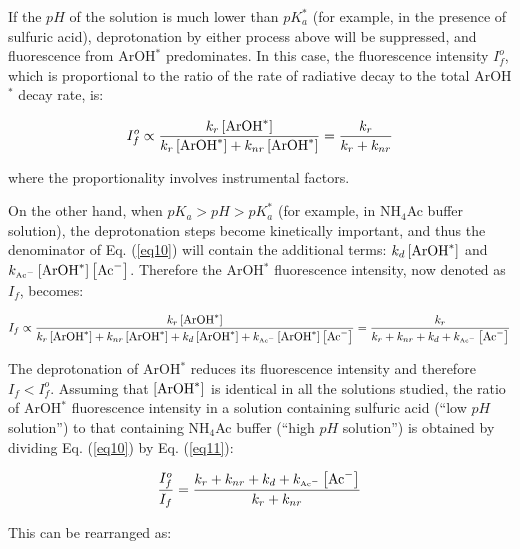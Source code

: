 \documentclass[byrevtex,amssymb,aps,pra,floatfix,letterpaper]{revtex4}
\begin{document}
If the $pH$ of the solution is much lower than $pK_a^*$ (for example, in the presence of sulfuric acid), deprotonation by either process above will be suppressed, and fluorescence from ArOH$^*$ predominates. In this case, the fluorescence intensity $I_f^o$, which is proportional to the ratio of the rate of radiative decay to the total ArOH$^*$ decay rate, is:

\begin{equation}
I_f^o \propto \frac{k_r\left[\textnormal{ArOH}^*\right]}{k_r\left[\textnormal{ArOH}^*\right] + k_{nr}\left[\textnormal{ArOH}^*\right]} = \frac{k_r}{k_r + k_{nr}}
\label{eq10}
\end{equation}

\noindent
where the proportionality involves instrumental factors.

On the other hand, when $pK_a > pH > pK_a^*$ (for example, in NH$_4$Ac buffer solution), the deprotonation steps become kinetically important, and thus the denominator of Eq. (\ref{eq10}) will contain the additional terms: $k_d\left[\textnormal{ArOH}^*\right]$ and $k_{\textnormal{\tiny Ac}^-}\left[\textnormal{ArOH}^*\right]\left[\textnormal{Ac}^-\right]$. Therefore the ArOH$^*$ fluorescence intensity, now denoted as $I_f$, becomes:

\begin{equation}
I_f \propto \frac{k_r\left[\textnormal{ArOH}^*\right]}{k_r\left[\textnormal{ArOH}^*\right] + k_{nr}\left[\textnormal{ArOH}^*\right] + k_d\left[\textnormal{ArOH}^*\right] + k_{\textnormal{\tiny Ac}^-}\left[\textnormal{ArOH}^*\right]\left[\textnormal{Ac}^-\right]} = \frac{k_r}{k_r + k_{nr} + k_d + k_{\textnormal{\tiny Ac}^-}\left[\textnormal{Ac}^-\right]}
\label{eq11}
\end{equation}

\noindent
The deprotonation of ArOH$^*$ reduces its fluorescence intensity and therefore $I_f < I_f^o$. Assuming that $\left[\textnormal{ArOH}^*\right]$ is identical in all the solutions studied, the ratio of ArOH$^*$ fluorescence intensity in a solution containing sulfuric acid (``low $pH$ solution'') to that containing NH$_4$Ac buffer (``high $pH$ solution'') is obtained by dividing Eq. (\ref{eq10}) by Eq. (\ref{eq11}):

\begin{equation}
\frac{I_f^o}{I_f} = \frac{k_r + k_{nr} + k_d + k_{\textnormal{\tiny Ac}^-}\left[\textnormal{Ac}^-\right]}{k_r + k_{nr}}
\label{eq12}
\end{equation}

\noindent
This can be rearranged as:
\end{document}
